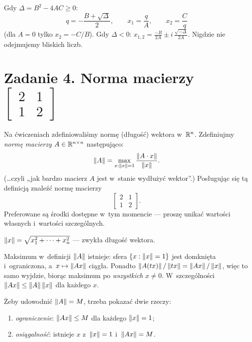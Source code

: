 \documentclass[11pt]{article}
\begin{document}
\begin{odpowiedz}
Gdy $\Delta=B^2-4AC\ge0$:
\[
q=-\frac{B+\sqrt\Delta}{2},\qquad x_1=\frac qA,\qquad x_2=\frac Cq
\]
(dla $A=0$ tylko $x_2=-C/B$). Gdy $\Delta<0$: $x_{1,2}=\frac{-B}{2A}\pm
i\,\frac{\sqrt{-\Delta}}{2A}$. Nigdzie nie odejmujemy bliskich liczb.
\end{odpowiedz}

\section{Zadanie 4. Norma macierzy \texorpdfstring{$\left[\begin{smallmatrix}2&1\\1&2\end{smallmatrix}\right]$}{[[2,1],[1,2]]}}
\begin{tresc}
Na ćwiczeniach zdefiniowaliśmy normę (długość) wektora w~$\mathbb{R}^n$.
Zdefiniujmy \emph{normę macierzy} $A\in\mathbb{R}^{n\times n}$ następująco:
\[
\left\lVert A \right\rVert=\max_{x:\left\lVert x \right\rVert=1}\frac{\left\lVert A\cdot x \right\rVert}{\left\lVert x \right\rVert}.
\]
(\ldots czyli „jak bardzo macierz $A$ jest w~stanie wydłużyć wektor”.)
Posługując się tą definicją znaleźć normę macierzy
\[
\begin{bmatrix}2&1\\1&2\end{bmatrix}.
\]
Preferowane są środki dostępne w~tym momencie --- proszę unikać wartości
własnych i~wartości szczególnych.
\end{tresc}

\begin{teoria}
\begin{definicja}
$\left\lVert x \right\rVert=\sqrt{x_1^2+\dots+x_n^2}$ --- zwykła długość wektora.
\end{definicja}

\begin{fakt}
Maksimum w~definicji $\left\lVert A \right\rVert$ istnieje: sfera $\{x:\left\lVert x \right\rVert=1\}$ jest
domknięta i~ograniczona, a~$x\mapsto\left\lVert Ax \right\rVert$ ciągła. Ponadto
$\left\lVert A(tx) \right\rVert/\left\lVert tx \right\rVert=\left\lVert Ax \right\rVert/\left\lVert x \right\rVert$, więc to samo wyjdzie, biorąc
maksimum po \emph{wszystkich} $x\ne0$. W~szczególności
$\left\lVert Ax \right\rVert\le\left\lVert A \right\rVert\left\lVert x \right\rVert$ dla każdego $x$.
\end{fakt}

Żeby udowodnić $\left\lVert A \right\rVert=M$, trzeba pokazać dwie rzeczy:
\begin{enumerate}
\item \emph{ograniczenie}: $\left\lVert Ax \right\rVert\le M$ dla każdego $\left\lVert x \right\rVert=1$;
\item \emph{osiągalność}: istnieje $x$ z~$\left\lVert x \right\rVert=1$ i~$\left\lVert Ax \right\rVert=M$.
\end{enumerate}
\end{teoria}
\end{document}
